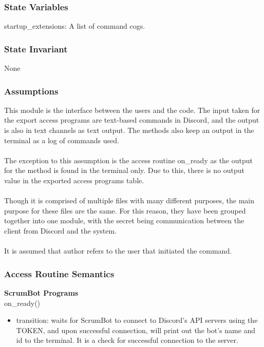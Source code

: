 \documentclass[12pt, titlepage]{article}
\begin{document}
\subsubsection* {State Variables}
startup\_extensions: A list of command cogs.

\subsubsection* {State Invariant}
None

\subsubsection* {Assumptions}
This module is the interface between the users and the code. The input taken for the export access programs are text-based commands in Discord, and the output is also in text channels as text output. The methods also keep an output in the terminal as a log of commands used.\\ \\
The exception to this assumption is the access routine on\_ready as the output for the method is found in the terminal only. Due to this, there is no output value in the exported access programs table.\\ \\
Though it is comprised of multiple files with many different purposes, the main purpose for these files are the same. For this reason, they have been grouped together into one module, with the secret being communication between the client from Discord and the system.\\ \\
It is assumed that author refers to the user that initiated the command.\\

\newpage

\subsubsection* {Access Routine Semantics}

\noindent \textbf{ScrumBot Programs\\}
\noindent on\_ready()
\begin{itemize}
    \item transition: waits for ScrumBot to connect to Discord's API servers using the TOKEN, and upon successful connection, will print out the bot's name and id to the terminal. It is a check for successful connection to the server.
\end{itemize}
\end{document}

